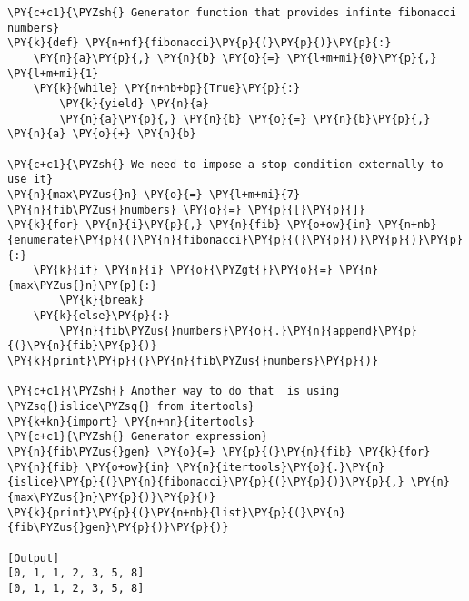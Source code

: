 \begin{Verbatim}[label=\makebox{\url{https://github.com/lucabaldini/cmepda/tree/master/slides/latex/snippets/fibonacci.py}},commandchars=\\\{\}]
\PY{c+c1}{\PYZsh{} Generator function that provides infinte fibonacci numbers}
\PY{k}{def} \PY{n+nf}{fibonacci}\PY{p}{(}\PY{p}{)}\PY{p}{:}
    \PY{n}{a}\PY{p}{,} \PY{n}{b} \PY{o}{=} \PY{l+m+mi}{0}\PY{p}{,} \PY{l+m+mi}{1}
    \PY{k}{while} \PY{n+nb+bp}{True}\PY{p}{:}
        \PY{k}{yield} \PY{n}{a}
        \PY{n}{a}\PY{p}{,} \PY{n}{b} \PY{o}{=} \PY{n}{b}\PY{p}{,} \PY{n}{a} \PY{o}{+} \PY{n}{b}

\PY{c+c1}{\PYZsh{} We need to impose a stop condition externally to use it}
\PY{n}{max\PYZus{}n} \PY{o}{=} \PY{l+m+mi}{7}
\PY{n}{fib\PYZus{}numbers} \PY{o}{=} \PY{p}{[}\PY{p}{]}
\PY{k}{for} \PY{n}{i}\PY{p}{,} \PY{n}{fib} \PY{o+ow}{in} \PY{n+nb}{enumerate}\PY{p}{(}\PY{n}{fibonacci}\PY{p}{(}\PY{p}{)}\PY{p}{)}\PY{p}{:}
    \PY{k}{if} \PY{n}{i} \PY{o}{\PYZgt{}}\PY{o}{=} \PY{n}{max\PYZus{}n}\PY{p}{:}
        \PY{k}{break}
    \PY{k}{else}\PY{p}{:}
        \PY{n}{fib\PYZus{}numbers}\PY{o}{.}\PY{n}{append}\PY{p}{(}\PY{n}{fib}\PY{p}{)}
\PY{k}{print}\PY{p}{(}\PY{n}{fib\PYZus{}numbers}\PY{p}{)}
      
\PY{c+c1}{\PYZsh{} Another way to do that  is using \PYZsq{}islice\PYZsq{} from itertools}
\PY{k+kn}{import} \PY{n+nn}{itertools}
\PY{c+c1}{\PYZsh{} Generator expression}
\PY{n}{fib\PYZus{}gen} \PY{o}{=} \PY{p}{(}\PY{n}{fib} \PY{k}{for} \PY{n}{fib} \PY{o+ow}{in} \PY{n}{itertools}\PY{o}{.}\PY{n}{islice}\PY{p}{(}\PY{n}{fibonacci}\PY{p}{(}\PY{p}{)}\PY{p}{,} \PY{n}{max\PYZus{}n}\PY{p}{)}\PY{p}{)}
\PY{k}{print}\PY{p}{(}\PY{n+nb}{list}\PY{p}{(}\PY{n}{fib\PYZus{}gen}\PY{p}{)}\PY{p}{)}

[Output]
[0, 1, 1, 2, 3, 5, 8]
[0, 1, 1, 2, 3, 5, 8]
\end{Verbatim}